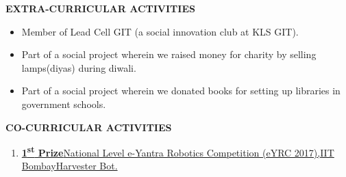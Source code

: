 \documentclass[a4paper]{article}
\begin{document}

	\begin{flushleft}
		\vspace{5mm}
		\large{\textbf{EXTRA-CURRICULAR ACTIVITIES }} 
		\vspace{0.5mm}
		\noindent\hrulefill
		\vspace{0.5mm}
	\end{flushleft}
	\begin{itemize}
		\item Member of Lead Cell GIT (a social innovation club at KLS GIT). 
		\item Part of a social project wherein we raised money for charity by selling lamps(diyas) during diwali. 
		\item Part of a social project wherein we donated books for setting up libraries in government schools.           
	\end{itemize}

	\begin{flushleft}
		\vspace{5mm}
		\large{\textbf{CO-CURRICULAR ACTIVITIES}} 
		\vspace{0.5mm}
		\noindent\hrulefill
		\vspace{0.5mm}
	\end{flushleft}
	\begin{enumerate}
		\item \href{http://eycgen.e-yantra.org/index.php/validate/1c554533d0991a7d96b51b2238d1d3df75ebc0b0}{\textbf{1\textsuperscript{st} Prize}\textbar National Level e-Yantra Robotics Competition (eYRC 2017),IIT Bombay\textbar Harvester Bot.}       
	\end{enumerate}
\end{document}
